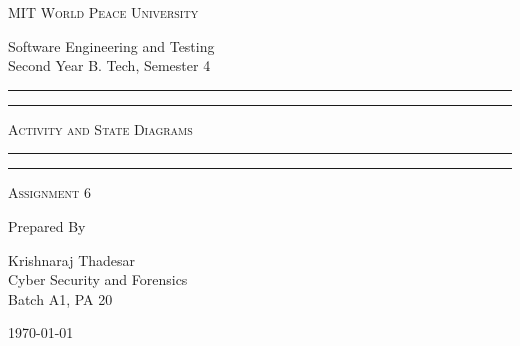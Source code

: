 \documentclass[11pt]{article}
\begin{document}
\begin{titlepage}
	\centering


	\huge\textsc{
		MIT World Peace University
	}\\

	\vspace{0.75\baselineskip} %

	\LARGE{
		Software Engineering and Testing\\
		Second Year B. Tech, Semester 4
	}

	\vfill %


	\rule{\textwidth}{1.6pt}\vspace*{-\baselineskip}\vspace*{2pt}
	\rule{\textwidth}{0.6pt}
	\vspace{0.75\baselineskip} %



	\huge{\textsc{
			Activity and State Diagrams
		}} \\



	\vspace{0.5\baselineskip} %
	\rule{\textwidth}{0.6pt}\vspace*{-\baselineskip}\vspace*{2.8pt}
	\rule{\textwidth}{1.6pt}

	\vspace{1\baselineskip} %


	\LARGE\textsc{
		\centering
		Assignment 6
	} %
	\vfill


	Prepared By
	\vspace{0.5\baselineskip} %

	\Large{
		Krishnaraj Thadesar \\
		Cyber Security and Forensics\\
		Batch A1, PA 20
	}


	\vspace{0.5\baselineskip} %
	\today

\end{titlepage}
\end{document}
